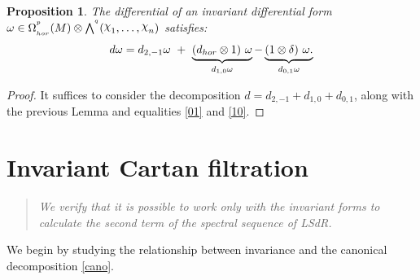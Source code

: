 \documentclass[a4paper,oneside,10pt,reqno]{amsart}
\newtheorem{proposition}[theorem]{Proposition}
\theoremstyle{definition}
\newcommand\chii{\raise2pt\hbox{$\chi$}}
\newcommand\Om{\Omega}
\newcommand\om{\omega}
\newcommand{\id}{{\large 1}}
\newcommand{\bi}[2]{{#1}^{^{#2}}}
\newcommand{\lau}[4]{{#1}^{^{#2}}_{_{#3}}{\left( #4 \right)}}
\begin{document}
\begin{proposition}\label{47}
The differential of an invariant differential form $\omega \in  \lau \Om p{hor} M \otimes \bi \bigwedge q (\chii_1, \ldots,\chii_n)$ satisfies:
  \begin{equation}\label{471}
d \omega =   d_{2,-1}\om    \  + \ \underbrace{ (d_{hor} \otimes \id)\ \omega }_{ d_{1,0} \om }   -    \underbrace{    (\id \otimes \delta) \ \omega. }_{d_{0,1} \om}
\end{equation}
\end{proposition}

\begin{proof} It suffices to consider  the decomposition $d= d_{2,-1}+ d_{1,0}+d_{0,1}$, along with the previous Lemma and  equalities \eqref{01} and \eqref{10}.
  \end{proof}


\section{Invariant Cartan filtration}
\begin{quote}
\emph{We verify that it is possible to work only with the invariant forms to calculate the second term of the spectral sequence of LSdR.
}
\end{quote}

We begin by studying the relationship between invariance and the canonical decomposition  \eqref{cano}.
\end{document}
